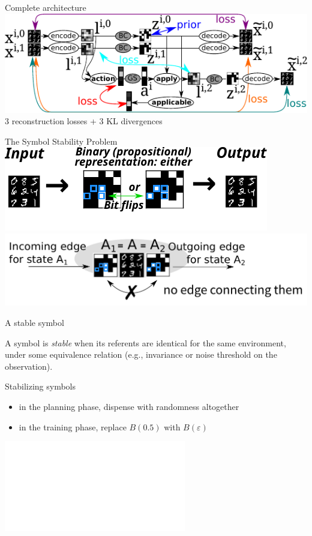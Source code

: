 \documentclass{lecture}
\begin{document}
\begin{frame}{Complete architecture}
    \vfill
    \includegraphics[width=\textwidth]{img___latplan___ama3.pdf}
    \pause
    \vfill
    3 reconstruction losses + 3 KL divergences
    \vfill
\end{frame}

\begin{frame}{The Symbol Stability Problem}
\includegraphics[width=\textwidth]{img___zsae___unstable.pdf}\\
\includegraphics[width=\textwidth]{no_edge.png}
\end{frame}

\begin{frame}{A stable symbol}
    \begin{block}{}
        A symbol is \emph{stable} when its referents are identical for the same environment, under some equivalence relation (e.g., invariance or noise threshold on the observation).
    \end{block}
\end{frame}

\begin{frame}{Stabilizing symbols}
    \vfill
    \begin{itemize}
        \item<+-> in the planning phase, dispense with randomness altogether
        \item<+-> in the training phase, replace $B(0.5)$ with $B(\varepsilon)$      
    \end{itemize}
    \vfill
    \includegraphics<+->[width=\textwidth]{img___zsae___overview.pdf}
    \vfill
\end{frame}
\end{document}
